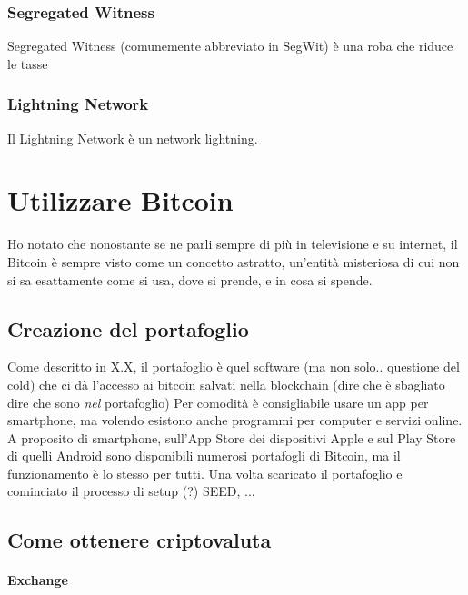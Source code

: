 \documentclass {article}
\begin{document}
\subsubsection {Segregated Witness}


Segregated Witness (comunemente abbreviato in SegWit) è una roba che riduce le tasse


\subsubsection {Lightning Network}


Il Lightning Network è un network lightning.


\section {Utilizzare Bitcoin}


Ho notato che nonostante se ne parli sempre di più in televisione e su internet, il Bitcoin è sempre visto come un concetto astratto, un'entità misteriosa di cui non si sa esattamente come si usa, dove si prende, e in cosa si spende.


\subsection {Creazione del portafoglio}


Come descritto in X.X, il portafoglio è quel software (ma non solo.. questione del cold) che ci dà l'accesso ai bitcoin salvati nella blockchain (dire che è sbagliato dire che sono \emph{nel} portafoglio)
Per comodità è consigliabile usare un app per smartphone, ma volendo esistono anche programmi per computer e servizi online.
A proposito di smartphone, sull'App Store dei dispositivi Apple e sul Play Store di quelli Android sono disponibili numerosi portafogli di Bitcoin, ma il funzionamento è lo stesso per tutti.
Una volta scaricato il portafoglio e cominciato il processo di setup (?) SEED, ...


\subsection {Come ottenere criptovaluta}


\paragraph {Exchange}
\end{document}
